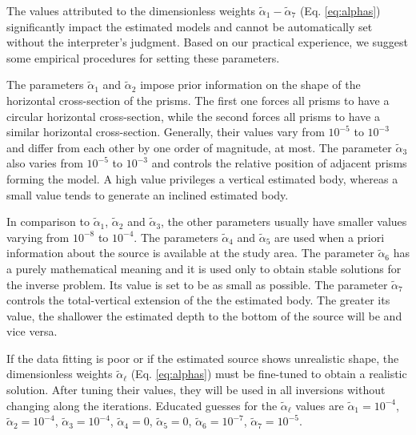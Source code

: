 
The values attributed to the dimensionless weights $\tilde{\alpha}_{1} - \tilde{\alpha}_{7}$ 
(Eq. \ref{eq:alphas}) significantly impact the estimated models and cannot be 
automatically set without the interpreter’s judgment. 
Based on our practical experience, we suggest some 
empirical procedures for setting these parameters.

The parameters $\tilde{\alpha}_1$ and $\tilde{\alpha}_2$ impose prior information 
on the shape of the horizontal cross-section of the prisms. 
The first one forces all prisms to have a circular horizontal cross-section, while 
the second forces all prisms to have a similar horizontal cross-section.
Generally, their values vary from $10^{-5}$ to $10^{-3}$ and differ from
each other by one order of magnitude, at most.
The parameter $\tilde{\alpha}_3$ also varies from $10^{-5}$ to $10^{-3}$ and 
controls the relative position of adjacent prisms forming the model.
A high value privileges a vertical estimated body, whereas a small value 
tends to generate an inclined estimated body.

In comparison to $\tilde{\alpha}_1$, $\tilde{\alpha}_2$ and $\tilde{\alpha}_3$,
the other parameters usually have smaller values varying from $10^{-8}$ to $10^{-4}$.
The parameters $\tilde{\alpha}_4$ and $\tilde{\alpha}_5$ are used when a priori
information about the source is available at the study area.
The parameter $\tilde{\alpha}_6$ has a purely mathematical meaning and it is 
used only to obtain stable solutions for the inverse problem.
Its value is set to be as small as possible.
The parameter $\tilde{\alpha}_7$ controls the total-vertical extension of the 
the estimated body. 
The greater its value, the shallower the estimated depth to the bottom of the source
will be and vice versa.

If the data fitting is poor or if the estimated source shows unrealistic shape,
the dimensionless weights $\tilde{\alpha}_{\ell}$ (Eq. \ref{eq:alphas}) must be
fine-tuned
to obtain a realistic solution. After tuning their values, they will be used in all
inversions without changing along the iterations. 
Educated guesses for the $\tilde{\alpha}_{\ell}$ values are 
$\tilde{\alpha}_1 = 10^{-4}$, $\tilde{\alpha}_2 = 10^{-4}$, $\tilde{\alpha}_3 = 10^{-4}$,
$\tilde{\alpha}_4 = 0$, $\tilde{\alpha}_5 = 0$, $\tilde{\alpha}_6 = 10^{-7}$, 
$\tilde{\alpha}_7 = 10^{-5}$.
